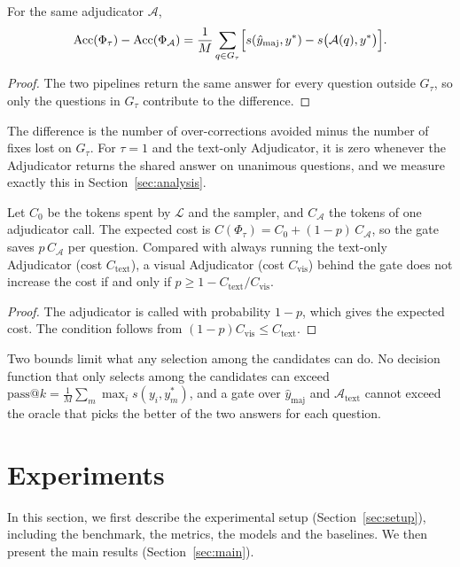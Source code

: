 \begin{proposition}
\label{prop:acc}
For the same adjudicator $\mathcal{A}$,
\[
\mathrm{Acc}(\Phi_\tau)-\mathrm{Acc}(\Phi_{\mathcal{A}})=\frac{1}{M}\sum_{q\in G_\tau}\Bigl[s(\hat y_{\mathrm{maj}},y^\ast)-s\bigl(\mathcal{A}(q),y^\ast\bigr)\Bigr].
\]
\end{proposition}
\begin{proof}
The two pipelines return the same answer for every question outside $G_\tau$, so only the questions in $G_\tau$ contribute to the difference.
\end{proof}

The difference is the number of over-corrections avoided minus the number of fixes lost on $G_\tau$. For $\tau=1$ and the text-only Adjudicator, it is zero whenever the Adjudicator returns the shared answer on unanimous questions, and we measure exactly this in Section~\ref{sec:analysis}.

\begin{proposition}
\label{prop:cost}
Let $C_0$ be the tokens spent by $\mathcal{L}$ and the sampler, and $C_{\mathcal{A}}$ the tokens of one adjudicator call. The expected cost is $C(\Phi_\tau)=C_0+(1-p)\,C_{\mathcal{A}}$, so the gate saves $p\,C_{\mathcal{A}}$ per question. Compared with always running the text-only Adjudicator (cost $C_{\mathrm{text}}$), a visual Adjudicator (cost $C_{\mathrm{vis}}$) behind the gate does not increase the cost if and only if $p\ge 1-C_{\mathrm{text}}/C_{\mathrm{vis}}$.
\end{proposition}
\begin{proof}
The adjudicator is called with probability $1-p$, which gives the expected cost. The condition follows from $(1-p)C_{\mathrm{vis}}\le C_{\mathrm{text}}$.
\end{proof}

Two bounds limit what any selection among the candidates can do. No decision function that only selects among the candidates can exceed $\mathrm{pass@}k=\frac{1}{M}\sum_m\max_i s(y_i,y^\ast_m)$, and a gate over $\hat y_{\mathrm{maj}}$ and $\mathcal{A}_{\mathrm{text}}$ cannot exceed the oracle that picks the better of the two answers for each question.

\section{Experiments}
\label{sec:experiments}

In this section, we first describe the experimental setup (Section~\ref{sec:setup}), including the benchmark, the metrics, the models and the baselines. We then present the main results (Section~\ref{sec:main}).

